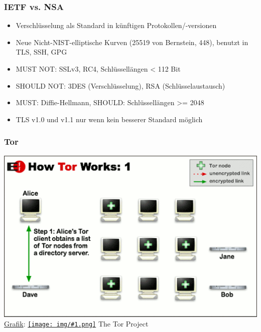 \documentclass[12pt, xcolor={svgnames,table}]{beamer}
\newcommand{\cc}[1]{\texttt{[image: img/\#1.png]}\hspace{1mm}}
\begin{document}
\begin{frame}
  \frametitle{IETF vs. NSA}
    \footnotesize
    \begin{itemize}
      \item Verschlüsselung als Standard in künftigen Protokollen/-versionen
      \item Neue Nicht-NIST-elliptische Kurven (25519 von Bernstein, 448), benutzt in TLS, SSH, GPG
      \item MUST NOT: SSLv3, RC4, Schlüssellängen < 112 Bit
      \item SHOULD NOT: 3DES (Verschlüsselung), RSA (Schlüsselaustausch)
      \item MUST: Diffie-Hellmann, SHOULD: Schlüssellängen >= 2048
      \item TLS v1.0 und v1.1 nur wenn kein besserer Standard möglich
    \end{itemize}
\end{frame}

\begin{frame}
    \frametitle{Tor}
    \includegraphics[height=0.7\textheight]{img/tor1.png}
    \\{\small \href{https://www.torproject.org/images/htw1.png}{Grafik}: \href{https://creativecommons.org/licenses/by/3.0/us/}{\cc{by}} The Tor Project}
\end{frame}
\end{document}
